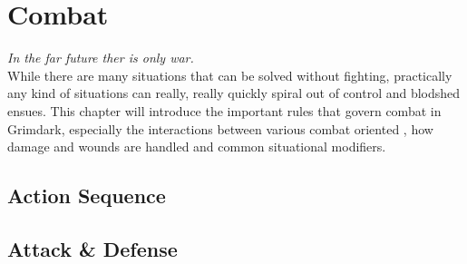 \chapter{Combat}
\textit{In the far future ther is only war.}\\
While there are many situations that can be solved without fighting, practically any kind of situations can really, really quickly spiral out of control and blodshed ensues. 
This chapter will introduce the important rules that govern combat in Grimdark, especially the interactions between various combat oriented , how damage and wounds are handled and common situational modifiers.
\section{Action Sequence}
\section{Attack \& Defense}